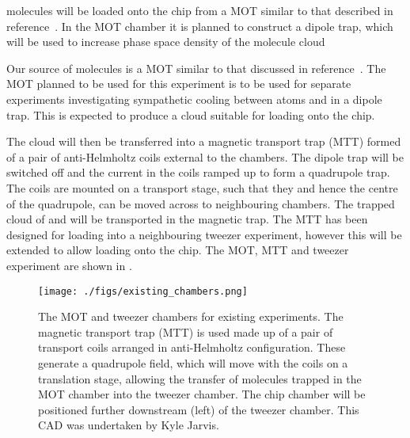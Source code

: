 
\CaF{} molecules will be loaded onto the chip from a MOT similar to
that described in reference~\cite{Truppe2017}.  In the MOT chamber it is planned
to construct a dipole trap, which will be used to increase phase space density
of the molecule cloud


Our source of \CaF{} molecules is a MOT similar to that discussed in
reference~\cite{Truppe2017}. The MOT planned to be used for this experiment is
to be used for separate experiments investigating sympathetic cooling between
\esRb{} atoms and \CaF{} in a dipole trap. This is expected to produce a \CaF{}
cloud suitable for loading onto the chip.

The cloud will then be transferred into a magnetic transport trap (MTT) formed of
a pair of anti-Helmholtz coils external to the chambers. The dipole trap will be
switched off and the current in the coils ramped up to form a quadrupole trap.
The coils are mounted on a transport stage, such that they and hence the centre
of the quadrupole, can be moved across to neighbouring chambers. The trapped
cloud of \CaF{} and \esRb{} will be transported in the magnetic trap.
The MTT has been designed for loading into a neighbouring tweezer experiment,
however this will be extended to allow loading onto the chip. The MOT, MTT and
tweezer experiment are shown in . 

\begin{figure}[ht]
  \texttt{[image: ./figs/existing\_chambers.png]}
  \caption{
    The MOT and tweezer chambers for existing experiments. The magnetic
    transport trap (MTT) is used made up of a pair of transport coils arranged
    in anti-Helmholtz configuration. These generate a quadrupole field, which
    will move with the coils on a translation stage, allowing the transfer of
    molecules trapped in the MOT chamber into the tweezer chamber. The chip
    chamber will be positioned further downstream (left) of the tweezer chamber.
    This CAD was undertaken by Kyle Jarvis.
  }
  \label{experiment:fig:MTTsetup}
\end{figure}

